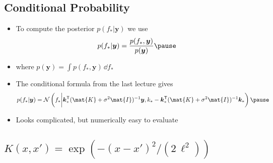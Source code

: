 \begin{slide}
\section{Conditional Probability}

\begin{PauseHighLight}
  \begin{itemize}
  \item To compute the posterior $p(f_*|\bm{y})$ we use
    \begin{align*}
      p(f_*|\bm{y}) = \frac{p(f_*,\bm{y})}{p(\bm{y})}\pause
    \end{align*}
  \item where $p(\bm{y}) = \int p(f_*,\bm{y}) \, \dd f_*$\pause
  \item The conditional formula from the last lecture gives
    \begin{align*}
      p(f_*|\bm{y}) = \mathcal{N}\left( f_* \bigg\vert
      \bm{k}_*^\tr(\mat{K} + \sigma^2 \mat{I})^{-1} \bm{y}, 
      k_* - \bm{k}_*^\tr(\mat{K} + \sigma^2 \mat{I})^{-1} \bm{k}_* \right)\pause
    \end{align*}
  \item Looks complicated, but numerically easy to evaluate\pause
  \end{itemize}
\end{PauseHighLight}


\end{slide}



\begin{slide}
\section[-2]{$K(x,x') = \exp(-(x-x')^2/(2\,\ell^2))$}
  
\pb\pause{}
\begin{center}
  \pause
\end{center}

\end{slide}


